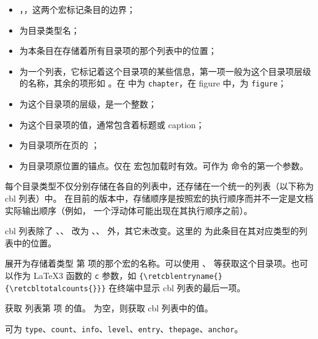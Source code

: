 \documentclass[twoside]{book}
\begin{document}
\begin{itemize}[nosep]
  \item {}，，这两个宏标记条目的边界；
  \item {} 为目录类型名；
  \item {} 为本条目在存储着所有目录项的那个列表中的位置；
  \item {} 为一个列表，它标记着这个目录项的某些信息，第一项一般为这个目录项层级的名称，其余的项形如 。在  中为 \texttt{chapter}，在 figure 中，为 \texttt{figure}；
  \item {} 为这个目录项的层级，是一个整数；
  \item {} 为这个目录项的值，通常包含着标题或 caption；
  \item {} 为目录项所在页的 ；
  \item {} 为目录项原位置的锚点。仅在  宏包加载时有效。可作为  命令的第一个参数。
\end{itemize}

每个目录类型不仅分别存储在各自的列表中，还存储在一个统一的列表（以下称为 cbl 列表）中。
在目前的版本中，存储顺序是按照宏的执行顺序而并不一定是文档实际输出顺序（例如，
一个浮动体可能出现在其执行顺序之前）。

cbl 列表除了 、、
 改为 、、
 外，其它未改变。这里的  为此条目在其对应类型的列表中的位置。

\begin{function}[EXP]{\retcblentryname}
  \begin{syntax}
    \V\retcblentryname {} 
  \end{syntax}
展开为存储着类型  第  项的那个宏的名称。可以使用 、\linebreak
{} 等获取这个目录项。也可以作为 \LaTeX3 函数的 \texttt{c} 参数，如  \verb|{\retcblentryname{}{\retcbltotalcounts{}}}| 在终端中显示 cbl 列表的最后一项。
\end{function}

\begin{function}[EXP]{\retcblentrydata}
  \begin{syntax}
    \V\retcblentrydata {}  
  \end{syntax}
获取  列表第  项  的值。 为空，则获取 cbl 列表中的值。

 可为 \texttt{type}、\texttt{count}、\texttt{info}、\texttt{level}、\texttt{entry}、\texttt{thepage}、\texttt{anchor}。
\end{function}
\end{document}

